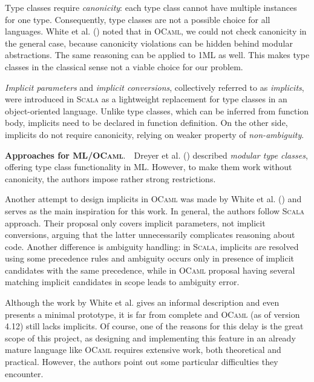 \documentclass{spbau-diploma}
\begin{document}
Type classes require \textit{canonicity}: each type class cannot have multiple instances for one type. Consequently, type classes are not a possible choice for all languages. White et al. (\citeyear{white}) noted that in \textsc{OCaml}, we could not check canonicity in the general case, because canonicity violations can be hidden behind modular abstractions. The same reasoning can be applied to \textsc{1ML} as well. This makes type classes in the classical sense not a viable choice for our problem.

\textit{Implicit parameters} and \textit{implicit conversions}, collectively referred to as \textit{implicits}, were introduced in \textsc{Scala} \citep{implicits} as a lightweight replacement for type classes in an object-oriented language. Unlike type classes, which can be inferred from function body, implicits need to be declared in function definition. On the other side, implicits do not require canonicity, relying on weaker property of \textit{non-ambiguity}.

\textbf{Approaches for \textsc{ML}/\textsc{OCaml}}.~~Dreyer et al. (\citeyear{ml_typeclasses}) described \textit{modular type classes}, offering type class functionality in \textsc{ML}. However, to make them work without canonicity, the authors impose rather strong restrictions. 

Another attempt to design implicits in \textsc{OCaml} was made by White et al. (\citeyear{white}) and serves as the main inspiration for this work. In general, the authors follow \textsc{Scala} approach. Their proposal only covers implicit parameters, not implicit conversions, arguing that the latter unnecessarily complicates reasoning about code. Another difference is ambiguity handling: in \textsc{Scala}, implicits are resolved using some precedence rules and ambiguity occurs only in presence of implicit candidates with the same precedence, while in \textsc{OCaml} proposal having several matching implicit candidates in scope leads to ambiguity error.

Although the work by White et al. gives an informal description and even presents a minimal prototype, it is far from complete and \textsc{OCaml} (as of version 4.12) still lacks implicits. Of course, one of the reasons for this delay is the great scope of this project, as designing and implementing this feature in an already mature language like \textsc{OCaml} requires extensive work, both theoretical and practical. However, the authors point out some particular difficulties they encounter.
\end{document}
